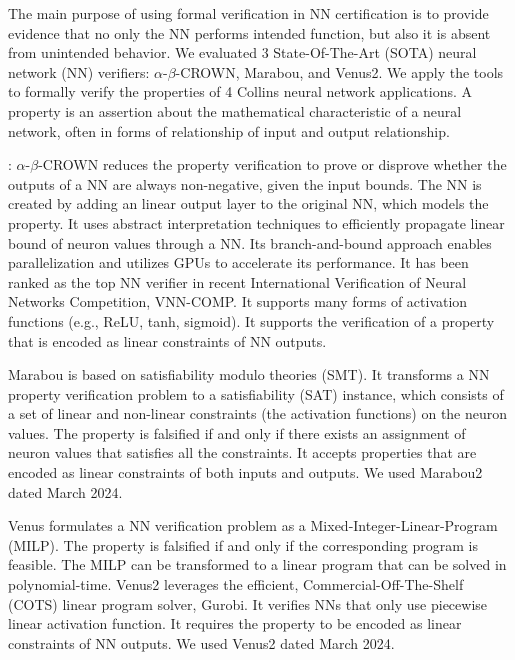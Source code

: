 The main purpose of using formal verification in NN certification is to provide evidence that no only the NN performs intended function, but also it is absent from unintended behavior. 
We evaluated 3 State-Of-The-Art (SOTA) neural network (NN) verifiers: $\alpha$-$\beta$-CROWN, Marabou, and Venus2. We apply the tools to formally verify the properties of 4 Collins neural network applications. A property is an assertion about the mathematical characteristic of a neural network, often in forms of relationship of input and output relationship.

: 
$\alpha$-$\beta$-CROWN \cite{abcrown} reduces the property verification to prove or disprove whether the  outputs of a NN are always non-negative, given the input bounds. The NN is created by adding an linear output layer to the original NN, which models the property. It uses abstract interpretation techniques to efficiently propagate linear bound of neuron values through a NN. Its branch-and-bound approach enables parallelization and utilizes GPUs to accelerate its performance. It has been ranked as the top NN verifier in recent International Verification of Neural Networks Competition, VNN-COMP. It supports many forms of activation functions (e.g., ReLU, tanh, sigmoid). It supports the verification of a property that is encoded as linear constraints of NN outputs.

Marabou \cite{marabou} \cite{marabou2} is based on satisfiability modulo theories (SMT). It transforms a NN property verification problem to a satisfiability (SAT) instance, which consists of a set of linear and non-linear constraints (the activation functions) on the neuron values. The property is falsified if and only if  there exists an assignment of neuron values that satisfies all the constraints. It accepts properties that are encoded as linear constraints of both inputs and outputs. We used Marabou2 dated March 2024.

Venus \cite{venus} formulates a NN verification problem as a Mixed-Integer-Linear-Program (MILP). The property is falsified if and only if the corresponding program is feasible. The MILP can be transformed to a linear program that can be solved in polynomial-time. Venus2 leverages the efficient, Commercial-Off-The-Shelf (COTS) linear program solver, Gurobi. It verifies NNs that only use piecewise linear activation function. It requires the property to be encoded as linear constraints of NN outputs. We used Venus2 dated March 2024.

